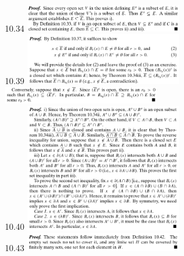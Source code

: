 \documentclass[3pt,landscape]{article}
\begin{document}
\begin{multicols}{3}
    10.34
    \includegraphics[width=250]{10_34.png} \\
    10.39
    \includegraphics[width=250]{10_39a.png} \\
    \includegraphics[width=250]{10_39b.png} \\
    10.40
    \includegraphics[width=250]{10_40.png} \\
    10.43
    \includegraphics[width=250]{10_43.png} \\

\end{multicols}
\end{document}
